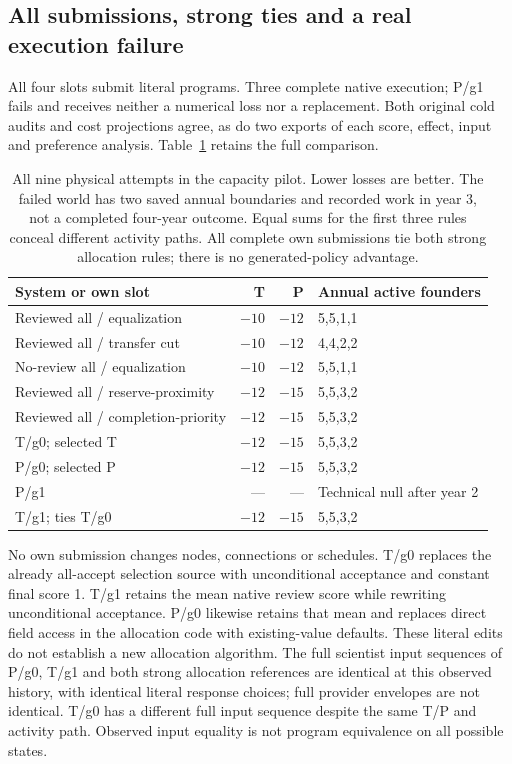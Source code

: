 \subsection{All submissions, strong ties and a real execution failure}
All four slots submit literal programs. Three complete native execution;
P/g1 fails and receives neither a numerical loss nor a replacement. Both
original cold audits and cost projections agree, as do two exports of each
score, effect, input and preference analysis.
Table~\ref{tab:capacity-all} retains the full comparison.

\begin{table}[t]
\centering\small
\begin{tabular}{lrrl}
\toprule
System or own slot & T & P & Annual active founders\\
\midrule
Reviewed all / equalization & $-10$ & $-12$ & 5,5,1,1\\
Reviewed all / transfer cut & $-10$ & $-12$ & 4,4,2,2\\
No-review all / equalization & $-10$ & $-12$ & 5,5,1,1\\
Reviewed all / reserve-proximity & $-12$ & $-15$ & 5,5,3,2\\
Reviewed all / completion-priority & $-12$ & $-15$ & 5,5,3,2\\
T/g0; selected T & $-12$ & $-15$ & 5,5,3,2\\
P/g0; selected P & $-12$ & $-15$ & 5,5,3,2\\
P/g1 & --- & --- & Technical null after year 2\\
T/g1; ties T/g0 & $-12$ & $-15$ & 5,5,3,2\\
\bottomrule
\end{tabular}
\caption{All nine physical attempts in the capacity pilot. Lower losses are
better. The failed world has two saved annual boundaries and recorded work
in year 3, not a completed four-year outcome. Equal sums for the first three
rules conceal different activity paths. All complete own submissions tie
both strong allocation rules; there is no generated-policy advantage.}
\label{tab:capacity-all}
\end{table}

No own submission changes nodes, connections or schedules. T/g0 replaces
the already all-accept selection source with unconditional acceptance and
constant final score 1. T/g1 retains the mean native review score while
rewriting unconditional acceptance. P/g0 likewise retains that mean and
replaces direct field access in the allocation code with existing-value
defaults. These literal edits do not establish a new allocation algorithm.
The full scientist input sequences of P/g0, T/g1 and both strong allocation
references are identical at this observed history, with identical literal
response choices; full provider envelopes are not identical. T/g0 has a
different full input sequence despite the same T/P and activity path.
Observed input equality is not program equivalence on all possible states.


